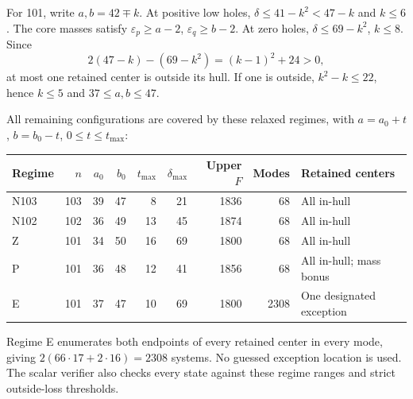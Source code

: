 \documentclass[11pt,a4paper]{article}
\begin{document}
For 101, write $a,b=42\mp k$. At positive low holes,
$\delta\le41-k^2<47-k$ and $k\le6$. The core masses satisfy
$\varepsilon_p\ge a-2$, $\varepsilon_q\ge b-2$.
At zero holes, $\delta\le69-k^2$, $k\le8$. Since
\[
 2(47-k)-(69-k^2)=(k-1)^2+24>0,
\]
at most one retained center is outside its hull. If one is outside,
$k^2-k\le22$, hence $k\le5$ and $37\le a,b\le47$.

All remaining configurations are covered by these relaxed regimes,
with $a=a_0+t$, $b=b_0-t$, $0\le t\le t_{\max}$:
\begin{center}\small
\begin{tabular}{lrrrrrrrl}
\toprule
Regime&$n$&$a_0$&$b_0$&$t_{\max}$&$\delta_{\max}$&Upper $F$&Modes&Retained centers\\
\midrule
N103&103&39&47&8&21&1836&68&All in-hull\\
N102&102&36&49&13&45&1874&68&All in-hull\\
Z&101&34&50&16&69&1800&68&All in-hull\\
P&101&36&48&12&41&1856&68&All in-hull; mass bonus\\
E&101&37&47&10&69&1800&2308&One designated exception\\
\bottomrule
\end{tabular}
\end{center}
Regime E enumerates both endpoints of every retained center in every
mode, giving $2(66\cdot17+2\cdot16)=2308$ systems. No guessed exception
location is used. The scalar verifier also checks every state against
these regime ranges and strict outside-loss thresholds.
\end{document}
